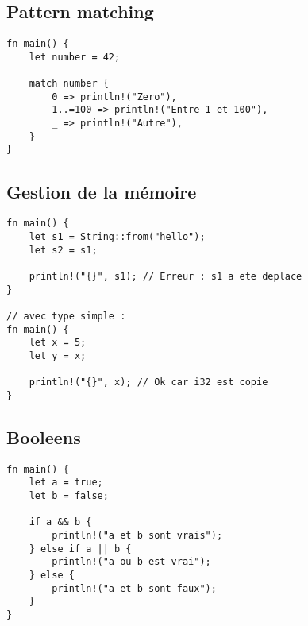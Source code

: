 \documentclass{article}
\begin{document}
\subsection{Pattern matching}
\begin{lstlisting}[]
fn main() {
    let number = 42;

    match number {
        0 => println!("Zero"),
        1..=100 => println!("Entre 1 et 100"),
        _ => println!("Autre"),
    }
}
\end{lstlisting}

\subsection{Gestion de la mémoire \cite{noauthor_what_nodate}}
\begin{lstlisting}[]
fn main() {
    let s1 = String::from("hello");
    let s2 = s1;

    println!("{}", s1); // Erreur : s1 a ete deplace
}

// avec type simple :
fn main() {
    let x = 5;
    let y = x;

    println!("{}", x); // Ok car i32 est copie
}
\end{lstlisting}

\subsection{Booleens}
\begin{lstlisting}[]
fn main() {
    let a = true;
    let b = false;

    if a && b {
        println!("a et b sont vrais");
    } else if a || b {
        println!("a ou b est vrai");
    } else {
        println!("a et b sont faux");
    }
}
\end{lstlisting}



\break\printbibliography
\end{document}
